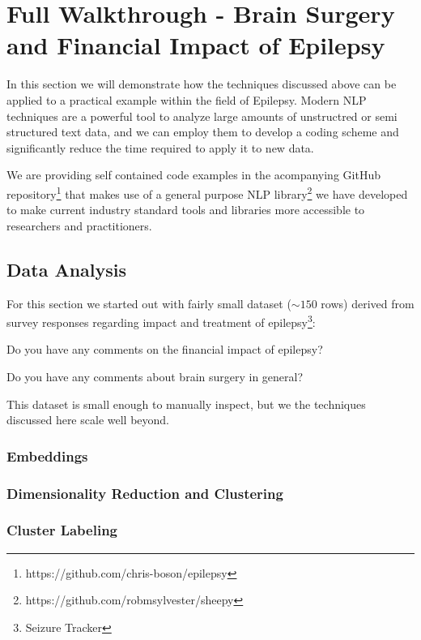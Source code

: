 \section{Full Walkthrough - Brain Surgery and Financial Impact of Epilepsy}

In this section we will demonstrate how the techniques discussed above can be applied to a practical example within the field of Epilepsy.
Modern NLP techniques are a powerful tool to analyze large amounts of unstructred or semi structured text data, and we can employ them to develop a coding scheme and significantly reduce the time required to apply it to new data.

We are providing self contained code examples in the acompanying GitHub repository\footnote{https://github.com/chris-boson/epilepsy} that makes use of a general purpose NLP library\footnote{https://github.com/robmsylvester/sheepy} we have developed to make current industry standard tools and libraries more accessible to researchers and practitioners.


\subsection{Data Analysis}
For this section we started out with fairly small dataset ($\sim150$ rows) derived from survey responses regarding  impact and treatment of epilepsy\footnote{Seizure Tracker}:
\begin{displayquote}
    Do you have any comments on the financial impact of epilepsy?

    Do you have any comments about brain surgery in general?
\end{displayquote}
This dataset is small enough to manually inspect, but we the techniques discussed here scale well beyond.
\subsubsection{Embeddings}

\subsubsection{Dimensionality Reduction and Clustering}
\subsubsection{Cluster Labeling}
